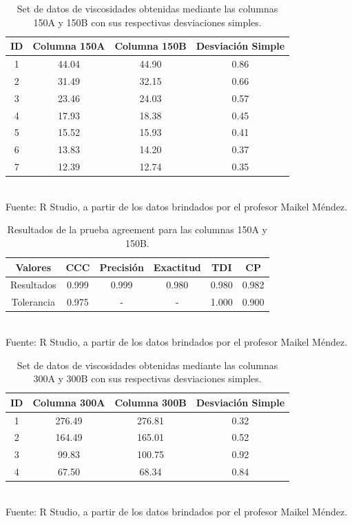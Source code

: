 \documentclass[12pt, letterpaper]{article}
\begin{document}
\begin{table}[ht]
\centering
\caption{Set de datos de viscosidades obtenidas mediante las columnas 150A y 150B con sus respectivas desviaciones simples.}
\begin{tabular}{cccc}
  \hline
ID & Columna 150A & Columna 150B & Desviación Simple \\ 
  \hline
  1 & 44.04 & 44.90 & 0.86 \\ 
  2 & 31.49 & 32.15 & 0.66 \\ 
  3 & 23.46 & 24.03 & 0.57 \\ 
  4 & 17.93 & 18.38 & 0.45 \\ 
  5 & 15.52 & 15.93 & 0.41 \\ 
  6 & 13.83 & 14.20 & 0.37 \\ 
  7 & 12.39 & 12.74 & 0.35 \\ 
   \hline
\end{tabular}\\
Fuente: R Studio, a partir de los datos brindados por el profesor Maikel Méndez.
\end{table}

\begin{table}[ht]
\centering
\caption{Resultados de la prueba agreement para las columnas 150A y 150B.}
\begin{tabular}{cccccc}
  \hline
Valores & CCC & Precisión & Exactitud & TDI & CP \\ 
  \hline
  Resultados & 0.999 & 0.999 & 0.980 & 0.980 & 0.982 \\ 
  Tolerancia & 0.975 & - & - & 1.000 & 0.900 \\ 
   \hline
\end{tabular}\\
Fuente: R Studio, a partir de los datos brindados por el profesor Maikel Méndez.
\end{table}

\begin{table}[ht]
\centering
\caption{Set de datos de viscosidades obtenidas mediante las columnas 300A y 300B con sus respectivas desviaciones simples.}
\begin{tabular}{cccc}
  \hline
ID & Columna 300A & Columna 300B & Desviación Simple \\ 
  \hline
  1 & 276.49 & 276.81 & 0.32 \\ 
  2 & 164.49 & 165.01 & 0.52 \\ 
  3 & 99.83 & 100.75 & 0.92 \\ 
  4 & 67.50 & 68.34 & 0.84 \\ 
   \hline
\end{tabular}\\
Fuente: R Studio, a partir de los datos brindados por el profesor Maikel Méndez.
\end{table}
\end{document}
